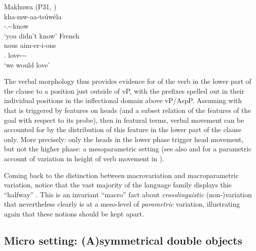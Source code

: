 \documentclass[output=paper]{langsci/langscibook}
\begin{document}
\ea\label{ex:vdwal:3.12} Makhuwa (P31, \citealt[169]{vanderWal2009})\\
    \gll kha-mw-aa-tsúwéla\\
        \Neg{}-\Spl.\Sm{}-\Ipfv{}-know\\
    \glt ‘you didn't know’
\ex\label{ex:vdwal:3.13} French\\
    \gll  nous  aim-er-i-ons\\
          \Fpl{}.\Pron{}  love-\Irr{}-\Pst{}-\Fsg{}\\
    \glt  ‘we would love’
\z

The verbal morphology thus provides evidence for  of the
verb in the lower part of the clause to a position just outside of vP, with the
prefixes spelled out in their individual positions in the inflectional domain
above vP/AspP. Assuming with \citet{Roberts2010} that  is
triggered by features on heads (and a subset relation of the features of the
goal with respect to its probe), then in featural terms,  verbal
movement can be accounted for by the distribution of this
feature in the lower part of the clause only. More precisely: only the heads in
the lower phase trigger head movement, but not the higher phase: a
mesoparametric setting (see also \citealt{Ledgeway2013} and
\citealt{Schifano2015} for a parametric account of variation in height of verb
movement in ).

Coming back to the distinction between macrovariation and macroparametric
variation, notice that the vast majority of the language family displays this
“halfway” . This is an invariant “macro” fact about 
\emph{crosslinguistic} (non-)variation that nevertheless clearly is at a
meso-level of \emph{parametric} variation, illustrating again that these
notions should be kept apart.

\subsection{Micro setting: (A)symmetrical double objects}\label{sub:3.2.3}
\end{document}
